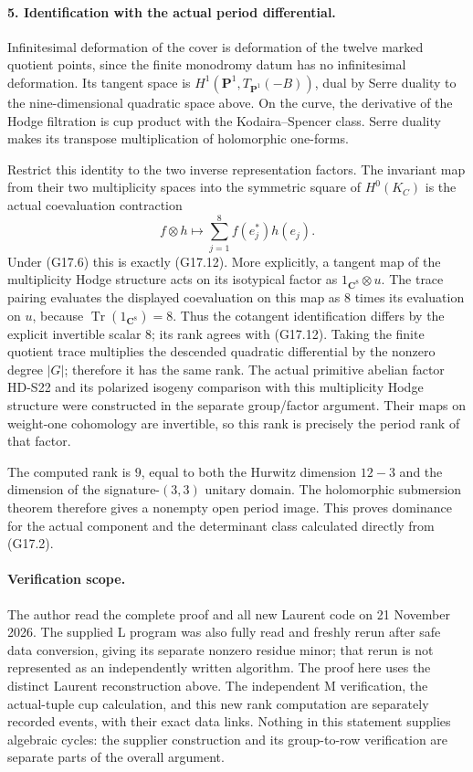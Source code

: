 \paragraph{5. Identification with the actual period differential.}
Infinitesimal deformation of the cover is deformation of the
twelve marked quotient points, since the finite monodromy datum
has no infinitesimal deformation.  Its tangent space is
$H^1(\mathbf P^1,T_{\mathbf P^1}(-B))$, dual by Serre duality
to the nine-dimensional quadratic space above.
On the curve, the derivative of the Hodge filtration is cup
product with the Kodaira--Spencer class.  Serre duality makes its
transpose multiplication of holomorphic one-forms.

Restrict this identity to the two inverse representation factors.
The invariant map from their two multiplicity spaces into
the symmetric square of $H^0(K_C)$ is the actual coevaluation
contraction
\[
       f\otimes h\longmapsto
               \sum_{j=1}^{8} f(e_j^*)h(e_j).
\]
Under (G17.6) this is exactly (G17.12).  More explicitly, a tangent
map of the multiplicity Hodge structure acts on its isotypical
factor as $1_{\mathbf C^8}\otimes u$.  The trace pairing evaluates
the displayed coevaluation on this map as $8$ times its evaluation
on $u$, because $\operatorname{Tr}(1_{\mathbf C^8})=8$.
Thus the cotangent identification differs by the explicit invertible
scalar $8$; its rank agrees with (G17.12).
Taking the finite quotient trace multiplies the descended quadratic
differential by the nonzero degree $|G|$; therefore it has the same
rank.  The actual primitive abelian factor HD-S22 and its polarized
isogeny comparison with this multiplicity Hodge structure were
constructed in the separate group/factor argument.  Their maps on
weight-one cohomology are invertible, so this rank is precisely the
period rank of that factor.

The computed rank is $9$, equal to both the Hurwitz dimension
$12-3$ and the dimension of the signature-$(3,3)$ unitary domain.
The holomorphic submersion theorem therefore gives a nonempty
open period image.  This proves dominance for the actual component
and the determinant class calculated directly from (G17.2).

\paragraph{Verification scope.}
The author read the complete proof and all new Laurent code on
21 November 2026.  The supplied L program was also fully read
and freshly rerun after safe data conversion, giving its separate
nonzero residue minor; that rerun is not represented as an
independently written algorithm.  The proof here uses the distinct
Laurent reconstruction above.  The independent M verification,
the actual-tuple cup calculation, and this new rank computation
are separately recorded events, with their exact data links.
Nothing in this statement supplies algebraic cycles: the supplier
construction and its group-to-row verification are separate parts
of the overall argument.
